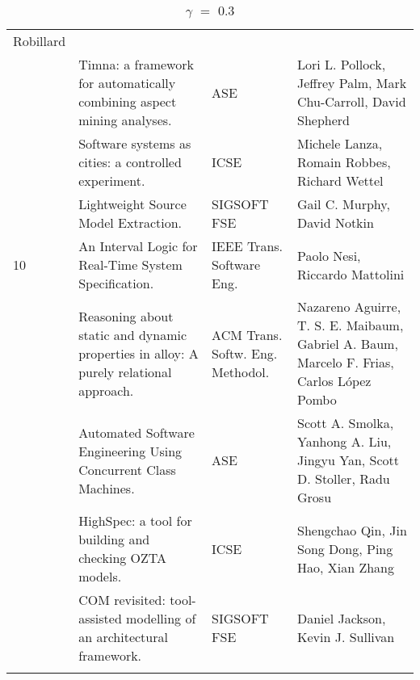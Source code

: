 \begin{center}
\begin{longtable}{|p{}p{}p{}p{}|}
Robillard \\
\rowcolor{black!20} & Timna: a framework for automatically combining aspect mining analyses.& ASE& 
Lori L. Pollock, Jeffrey Palm, Mark Chu-Carroll, David Shepherd \\
 & Software systems as cities: a controlled experiment.& ICSE& Michele Lanza, Romain Robbes, Richard 
Wettel \\
\rowcolor{black!20} & Lightweight Source Model Extraction.& SIGSOFT FSE& Gail C. Murphy, David 
Notkin \\
10 & An Interval Logic for Real-Time System Specification.& IEEE Trans. Software Eng.& Paolo Nesi, 
Riccardo Mattolini \\
\rowcolor{black!20} & Reasoning about static and dynamic properties in alloy: A purely relational 
approach.& ACM Trans. Softw. Eng. Methodol.& Nazareno Aguirre, T. S. E. Maibaum, Gabriel A. Baum, 
Marcelo F. Frias, Carlos López Pombo \\
 & Automated Software Engineering Using Concurrent Class Machines.& ASE& Scott A. Smolka, Yanhong A. 
Liu, Jingyu Yan, Scott D. Stoller, Radu Grosu \\
\rowcolor{black!20} & HighSpec: a tool for building and checking OZTA models.& ICSE& Shengchao Qin, 
Jin Song Dong, Ping Hao, Xian Zhang \\
 & COM revisited: tool-assisted modelling of an architectural framework.& SIGSOFT FSE& Daniel 
Jackson, Kevin J. Sullivan \\
    \hline
    \caption {$\gamma$ $=$ $0.3$}
\end{longtable}
\end{center}